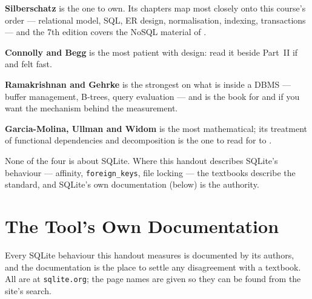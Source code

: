 \begin{conceptbox}
\begin{tight}
  \item \textbf{Silberschatz} is the one to own. Its chapters map most closely
        onto this course's order --- relational model, SQL, ER design,
        normalisation, indexing, transactions --- and the 7th edition covers
        the NoSQL material of .
  \item \textbf{Connolly and Begg} is the most patient with design: read it
        beside Part~II if  and  felt fast.
  \item \textbf{Ramakrishnan and Gehrke} is the strongest on what is inside a
        DBMS --- buffer management, B-trees, query evaluation --- and is the
        book for  and  if you want the
        mechanism behind the measurement.
  \item \textbf{Garcia-Molina, Ullman and Widom} is the most mathematical;
        its treatment of functional dependencies and decomposition is the one
        to read for  to .
\end{tight}

\smallskip
None of the four is about SQLite. Where this handout describes SQLite's
behaviour --- affinity,  \texttt{foreign\_keys}, file locking ---
the textbooks describe the standard, and SQLite's own documentation (below) is
the authority.
\end{conceptbox}

\section{The Tool's Own Documentation}

Every SQLite behaviour this handout measures is documented by its authors,
and the documentation is the place to settle any disagreement with a
textbook. All are at \texttt{sqlite.org}; the page names are given so they can
be found from the site's search.

